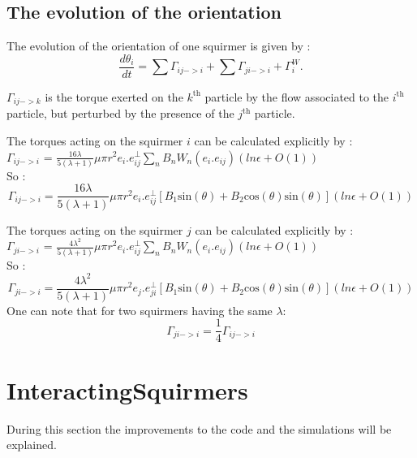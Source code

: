 \documentclass{article}
\begin{document}
\subsection{The evolution of the orientation}
The evolution of the orientation of one squirmer is given by : 
$$
\frac{d \theta_i}{dt} = \sum \Gamma_{ij->i} + \sum \Gamma_{ji->i} +  \Gamma_{i}^W.
$$

$\Gamma_{ij->k}$ is the torque exerted on the $k^\mathrm{th}$ particle by the flow associated to the $i^\mathrm{th}$ particle, but perturbed by the presence of the $j^\mathrm{th}$ particle.\\

\vspace{0.5cm}

The torques acting on the squirmer $i$ can be calculated explicitly by : \\
$\Gamma_{ij->i}$ = $\frac{16 \lambda}{5(\lambda +1)} \mu \pi r^2 e_i.e^{\perp}_{ij}\sum_{n} B_n W_n(e_i.e_{ij}) (ln \epsilon + O(1))$ \cite{Brumley}
\\ So :
\begin{equation*}
    \boxed{\Gamma_{ij->i} = \frac{16 \lambda}{5(\lambda +1)} \mu \pi r^2 e_i.e^{\perp}_{ij}\left[B_1\mathrm{sin}(\theta) +B_2\mathrm{cos}(\theta)\mathrm{sin}(\theta) \right] (ln \epsilon + O(1))}
\end{equation*}

The torques acting on the squirmer $j$ can be calculated explicitly by : \\
$\Gamma_{ji->i}$ = $\frac{4 \lambda^2}{5(\lambda +1)} \mu \pi r^2 e_i.e^{\perp}_{ij}\sum_{n} B_n W_n(e_i.e_{ij}) (ln \epsilon + O(1))$ \cite{Brumley}
\\ So :
\begin{equation*}
    \boxed{\Gamma_{ji->i} = \frac{4 \lambda^2}{5(\lambda +1)} \mu \pi r^2 e_j.e^{\perp}_{ji}\left[B_1\mathrm{sin}(\theta) +B_2\mathrm{cos}(\theta)\mathrm{sin}(\theta) \right] (ln \epsilon + O(1))}
\end{equation*}
One can note that for two squirmers having the same $\lambda$:
$$\Gamma_{ji->i} = \frac{1}{4}\Gamma_{ij->i}$$

\section{InteractingSquirmers}
During this section the improvements to the code and the simulations will be explained.\\
\end{document}
